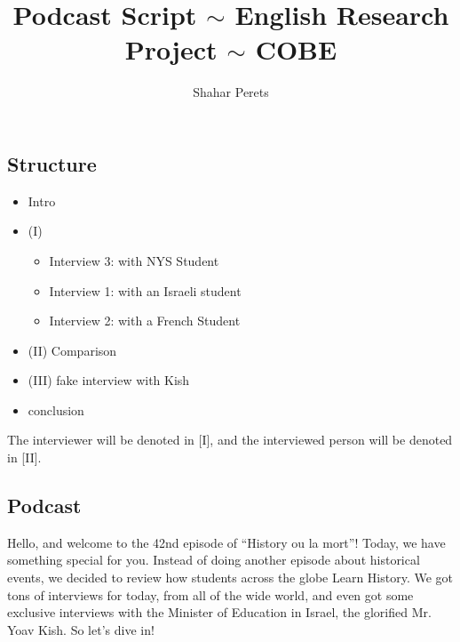 \documentclass[]{../../../../tex/classes/styledArticle}
\author{Shahar Perets}
\title{Podcast Script $\sim$ English Research Project $\sim$ COBE}
\begin{document}
	\maketitle
	\subsection*{Structure}
	\begin{itemize}
		\item Intro
		\item (I)
		\begin{itemize}
			\item Interview 3: with NYS Student
			\item Interview 1: with an Israeli student
			\item Interview 2: with a French Student
		\end{itemize}
		\item (II) Comparison
		\item (III) fake interview with Kish
		\item conclusion
	\end{itemize}
	
	The interviewer will be denoted in [I], and the interviewed person will be denoted in [II]. 
	
	\subsection*{Podcast}
	
	Hello, and welcome to the 42nd episode of ``History ou la mort''! Today, we have something special for you. Instead of doing another episode about historical events, we decided to review how students across the globe Learn History. We got tons of interviews for today, from all of the wide world, and even got some exclusive interviews with the Minister of Education in Israel, the glorified Mr. Yoav Kish. So let's dive in!
	
\end{document}
